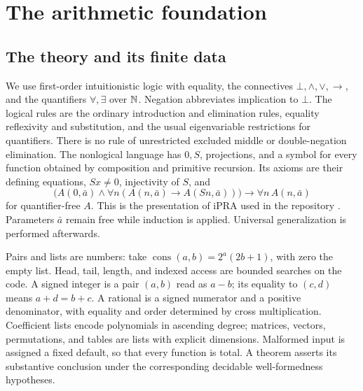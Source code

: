 \section{The arithmetic foundation}
\label{sec:foundation}
\subsection{The theory and its finite data}
We use first-order intuitionistic logic with equality, the connectives
$\bot,\land,\lor,\to$, and the quantifiers $\forall,\exists$ over $\mathbb N$.
Negation abbreviates implication to $\bot$. The logical rules are the
ordinary introduction and elimination rules, equality reflexivity and
substitution, and the usual eigenvariable restrictions for quantifiers.
There is no rule of unrestricted excluded middle or double-negation
elimination. The nonlogical language has $0,S$, projections, and a symbol
for every function obtained by composition and primitive recursion. Its
axioms are their defining equations, $Sx\ne0$, injectivity of $S$, and
\[
 \bigl(A(0,\bar a)\land\forall n(A(n,\bar a)\to A(Sn,\bar a))\bigr)
       \to\forall n\,A(n,\bar a)
\]
for quantifier-free $A$. This is the presentation of iPRA used in the
repository \cite{proveit}. Parameters $\bar a$ remain free while induction
is applied. Universal generalization is performed afterwards.

Pairs and lists are numbers: take $\operatorname{cons}(a,b)=2^a(2b+1)$,
with zero the empty list. Head, tail, length, and indexed access are
bounded searches on the code. A signed integer is a pair $(a,b)$ read
as $a-b$; its equality to $(c,d)$ means $a+d=b+c$. A rational is a signed
numerator and a positive denominator, with equality and order determined
by cross multiplication. Coefficient lists encode polynomials in ascending
degree; matrices, vectors, permutations, and tables are lists with explicit
dimensions. Malformed input is assigned a fixed default, so that every
function is total. A theorem asserts its substantive conclusion under
the corresponding decidable well-formedness hypotheses.

